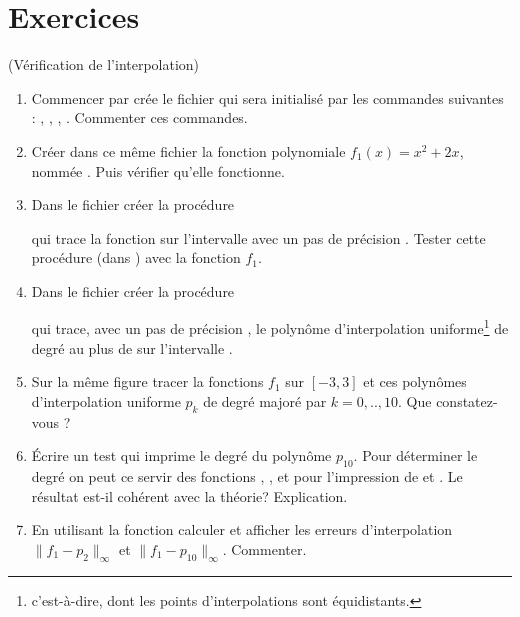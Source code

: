 \documentclass[a4paper,12pt,reqno]{amsart}
\begin{document}
\section{Exercices}

\begin{exo} (Vérification de l'interpolation)

  \begin{enumerate}
    \item Commencer par crée le fichier  qui sera initialisé par les commandes suivantes : , , , . Commenter ces commandes.

    \item Créer dans ce même fichier la fonction polynomiale $f_{1}(x)=x^{2}+2x$, nommée . Puis vérifier qu'elle fonctionne.

    \item Dans le fichier  créer la procédure
    \begin{center}
    \end{center}
    qui trace la fonction  sur l'intervalle \mtlb{[-a,a]} avec un pas de précision . Tester cette procédure (dans ) avec la fonction $f_{1}$.

    \item Dans le fichier  créer la procédure
    \begin{center}
    \end{center}
    qui trace, avec un pas de précision , le polynôme d'interpolation uniforme\footnote{c'est-à-dire, dont les points d'interpolations sont équidistants.} de degré au plus  de  sur l'intervalle \mtlb{[-a,a]}.

    \item Sur la même figure tracer la fonctions $f_{1}$ sur $[-3,3]$ et ces polynômes d'interpolation uniforme $p_{k}$ de degré majoré par $k=0,..,10$. Que constatez-vous ?

    \item Écrire un test qui imprime le degré du polynôme $p_{10}$. Pour déterminer le degré on peut ce servir des fonctions , , et pour l'impression de  et .\newline
    Le résultat est-il cohérent avec la théorie? Explication.

    \item En utilisant la fonction  calculer et afficher les erreurs d'interpolation $\|f_{1}-p_{2}\|_{\infty}$ et $\|f_{1}-p_{10}\|_{\infty}$. Commenter.

  \end{enumerate}
\end{exo}
\end{document}

